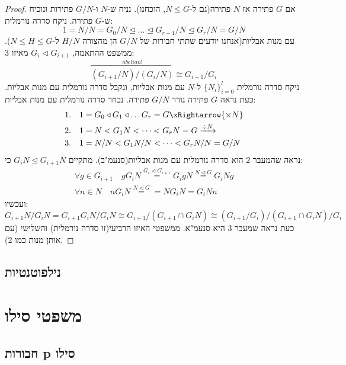 \documentclass{tstextbook}
\begin{document}
\begin{proof}
אם \(G\) פתירה אז \(N\) פתירה(גם ל-\(N\leq G\), הוכחנו). נניח ש-\(N\) ו-\(G / N\) פתירות ונוכיח ש-\(G\) פתירה. ניקח סדרה נורמלית:
$$1=N / N = G_{0} / N \trianglelefteq  \dots \trianglelefteq G_{r-1} / N \trianglelefteq  G_{r} / N = G / N$$
עם מנות אבליות(אנחנו יודעים שתתי חבורות של \(G / N\) הן מהצורה \(H / N\) ל-\(N\leq H\leq G\)). ממשפט ההתאמה, \(G_{i}\triangleleft G_{i+1}\) מאיזו 3:
$$\overbracket{ (G_{i+1} / N) / (G_{i} / N) }^{ abelian! } \cong G_{i+1} / G_{i}$$
ניקח סדרה נורמלית \(\{ N_{i} \}_{i=0}^l\) ל-\(N\) עם מנות אבליות, ונקבל סדרה נורמלית עם מנות אבליות. כעת נראה \(G\) פתירה גורר \(G / N\) פתירה. נבחר סדרה
נורמלית עם מנות אבליות: 
$$\begin{aligned}1.\quad &1=G_{0}\triangleleft G_{1} \triangleleft \dots G_{r}= G \xRightarrow{\times N}\\2.\quad &1=N<G_{1}N<\dots <G_{r}N=G \xrightarrow{ \div N} \\3.\quad &1=N / N < G_{1} N / N<\dots < G_{r}N / N = G / N
\end{aligned}$$
נראה שהמעבר 2 הוא סדרה נורמלית עם מנות אבליות(סנעמ"ב). מתקיים \(G_{i}N\trianglelefteq G_{i+1}N\) כי: 
$$\begin{gathered}\forall g \in  G_{i+1}\quad  gG_{i}N\stackrel{G_{i} \triangleleft G_{i+1}}{=} G_{i}gN\stackrel{N\triangleleft G}{=} G_{i}Ng \\\forall n \in N\quad nG_{i}N \stackrel{N\triangleleft G}{=} = NG_{i}N = G_{i}Nn
\end{gathered}$$
ועכשיו:
$$G_{i+1}N / G_{i}N= G_{i+1 }G_{i}N / G_{i}N \cong G_{i+1} /\left(  G_{i+1}\cap G_{i}N \right) \cong (G_{i+1} / G_{i}) / \left( G_{i+1} \cap G_{i}N \right) / G_{i}$$
כעת נראה שמעבר 3 היא סנעמ"א. ממשפטי האיזו הרביעי(זו סדרה נורמלית) והשלישי (עם אותן מנות כמו 2).

\end{proof}
\subsection{נילפוטנטיות}

\section{משפטי סילו}

\subsection{חבורות p סילו}
\end{document}
